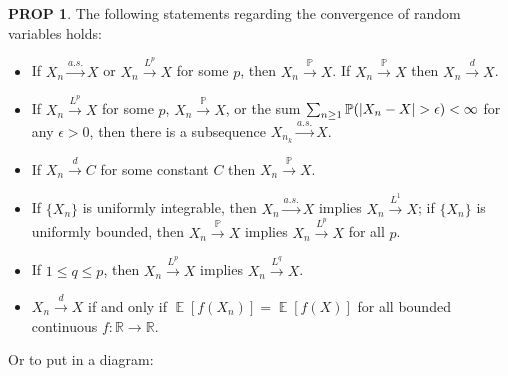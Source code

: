 \documentclass[hidelinks,11pt]{article}
\theoremstyle{definition}
\theoremstyle{dotless}
\newtheorem{prop}{PROP}[section]
\theoremstyle{remark}
\DeclareMathOperator{\E}{\mathbb{E}}
\DeclareMathOperator{\1}{\mathbf{1}}
\begin{document}
\begin{prop}
The following statements regarding the convergence of random variables holds:\begin{itemize}
    \item If $X_n\xrightarrow{a.s.}X$ or $X_n\xrightarrow{L^p}X$ for some $p$, then $X_n\xrightarrow{\mathbb{P}}X$. If $X_n\xrightarrow{\mathbb{P}}X$ then $X_n\xrightarrow{d}X$.
    \item If $X_n\xrightarrow{L^p}X$ for some $p$, $X_n\xrightarrow{\mathbb{P}}X$, or the sum $\sum_{n\geq1}\mathbb{P}(\abs{X_n-X}>\epsilon)<\infty$ for any $\epsilon>0$, then there is a subsequence $X_{n_k}\xrightarrow{a.s.}X$.
    \item If $X_n\xrightarrow{d}C$ for some constant $C$ then $X_n\xrightarrow{\mathbb{P}}X$.
    \item If $\{X_n\}$ is uniformly integrable, then $X_n\xrightarrow{a.s.}X$ implies $X_n\xrightarrow{L^1}X$; if $\{X_n\}$ is uniformly bounded, then $X_n\xrightarrow{\mathbb{P}}X$ implies $X_n\xrightarrow{L^p}X$ for all $p$.
    \item If $1\leq q\leq p$, then $X_n\xrightarrow{L^p}X$ implies $X_n\xrightarrow{L^q}X$.
    \item $X_n\xrightarrow{d}X$ if and only if $\E[f(X_n)]=\E[f(X)]$ for all bounded continuous $f:\mathbb{R}\to\mathbb{R}$.
\end{itemize}
Or to put in a diagram:
\begin{center}\end{center}
\end{prop}
\end{document}
